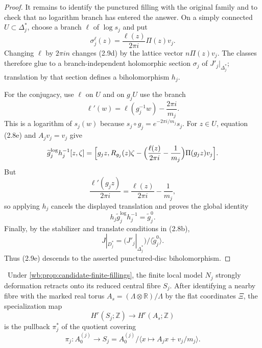 \begin{proof}
It remains to identify the punctured filling with the original family and
to check that no logarithm branch has entered the answer.  On a simply
connected \(U\subset\Delta_j^*\), choose a branch \(\ell\) of
\(\log s_j\) and put
\[
 \sigma_j^\ell(z)=\frac{\ell(z)}{2\pi i}\Pi(z)v_j.
 \tag{2.9d}
\]
Changing \(\ell\) by \(2\pi in\) changes (2.9d) by the lattice vector
\(n\Pi(z)v_j\).  The classes therefore glue to a branch-independent
holomorphic section \(\sigma_j\) of \(J'_j|_{\Delta_j^*}\); translation by
that section defines a biholomorphism \(h_j\).

For the conjugacy, use \(\ell\) on \(U\) and on \(g_jU\) use the branch
\[
 \ell'(w)=\ell(g_j^{-1}w)-\frac{2\pi i}{m_j}.
\]
This is a logarithm of \(s_j(w)\) because
\(s_j\circ g_j=e^{-2\pi i/m_j}s_j\).  For \(z\in U\), equation (2.8e)
and \(A_jv_j=v_j\) give
\[
\begin{aligned}
 \widetilde g_j^{\log}h_j^{-1}[z,\zeta]
  =\Bigl[g_jz,R_{g_j}(z)\zeta
  -\Bigl(\frac{\ell(z)}{2\pi i}-\frac1{m_j}\Bigr)
    \Pi(g_jz)v_j\Bigr].
\end{aligned}
\]
But
\[
 \frac{\ell'(g_jz)}{2\pi i}
 =\frac{\ell(z)}{2\pi i}-\frac1{m_j},
\]
so applying \(h_j\) cancels the displayed translation and proves the
global identity
\[
 h_j\widetilde g_j^{\log}h_j^{-1}=\widetilde g_j^{0}.
 \tag{2.9e}
\]
Finally, by the stabilizer and translate conditions in (2.8b),
\[
 J|_{D_j^*}
 =\bigl(J'_j|_{\Delta_j^*}\bigr)/
   \langle\widetilde g_j^{0}\rangle.
\]
Thus (2.9e) descends to the asserted punctured-disc biholomorphism.
\end{proof}

\begin{lemma}
\label{wb:lem:finite-filling-stalk-map}
\ Under \cref{wb:prop:candidate-finite-fillings}, the finite local
model \(N_j\) strongly deformation retracts onto its reduced central fibre
\(S_j\).  After identifying a nearby fibre with the marked real torus
\(A_s=(\Lambda\otimes\mathbb R)/\Lambda\) by the flat coordinates
\(\Xi\), the specialization map
\[
 H^r(S_j;\mathbb Z)\longrightarrow H^r(A_s;\mathbb Z)
\]
is the pullback \(\pi_j^*\) of the quotient covering
\[
 \pi_j:A_0^{(j)}\longrightarrow
 S_j=A_0^{(j)}/\langle x\mapsto A_jx+v_j/m_j\rangle .
\]
\end{lemma}

